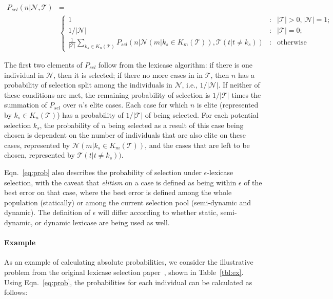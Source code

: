 \documentclass[preprint]{article}
\begin{document}
{\scriptsize
\begin{align}\label{eq:prob}
P_{sel}(n | \mathcal{N}, \mathcal{T}) &= \\
 &\left\{\nonumber 
     \begin{array}{lcr}
       1 & : & |\mathcal{T}| >0, |\mathcal{N}| = 1; \\
       1/|\mathcal{N}| & : &|\mathcal{T}| = 0; \\ 
       \frac{1}{|\mathcal{T}|}\sum_{k_s \in K_n(\mathcal{T})}{P_{sel} \left( n | \mathcal{N}(m|k_s \in K_m(\mathcal{T})), \mathcal{T}(t|t \neq k_s) \right)} & : & \text{otherwise}
     \end{array}
   \right. 
\end{align}
}

The first two elements of $P_{sel}$ follow from the lexicase algorithm: if there is one individual in $\mathcal{N}$, then it is selected; if there no more cases in in $\mathcal{T}$, then $n$ has a probability of selection split among the individuals in $\mathcal{N}$, i.e.,  $1/|\mathcal{N}|$. If neither of these conditions are met, the remaining probability of selection is $1/|\mathcal{T}|$ times the summation of $P_{sel}$ over $n$'s elite cases. Each case for which $n$ is elite (represented by $k_s \in K_n(\mathcal{T})$) has a probability of $1/|\mathcal{T}|$ of being selected. For each potential selection $k_s$, the probability of $n$ being selected as a result of this case being chosen is dependent on the number of individuals that are also elite on these cases, represented by $\mathcal{N}(m|k_s \in K_m(\mathcal{T}))$, and the cases that are left to be chosen, represented by $\mathcal{T}(t|t \neq k_s) )$. 

Eqn.~\ref{eq:prob} also describes the probability of selection under $\epsilon$-lexicase selection, with the caveat that {\it elitism} on a case is defined as being within $\epsilon$ of the best error on that case, where the best error is defined among the whole population (statically) or among the current selection pool (semi-dynamic and dynamic). The definition of $\epsilon$ will differ according to whether static, semi-dynamic, or dynamic lexicase are being used as well.   

\paragraph{Example}
As an example of calculating absolute probabilities, we consider the illustrative problem from the original lexicase selection paper~\cite{spector_assessment_2013}, shown in Table~\ref{tbl:ex}. Using Eqn.~\ref{eq:prob}, the probabilities for each individual can be calculated as follows:
\end{document}
